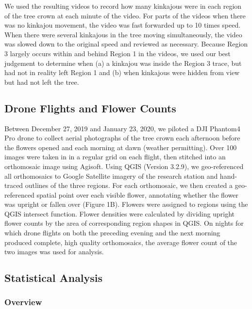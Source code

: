 \documentclass[twoside,12pt,final]{ucthesis-CA2012}
\begin{document}
\begin{ucmainmatter}
\begin{figure}[htbp]
{\label{fig1}}
\end{figure}
We used the resulting videos to record how many kinkajous were in each region of the tree crown at each minute of the video. For parts of the videos when there was no kinkajou movement, the video was fast forwarded up to 10 times speed. When there were several kinkajous in the tree moving simultaneously, the video was slowed down to the original speed and reviewed as necessary. Because Region 3 largely occurs within and behind Region 1 in the videos, we used our best judgement to determine when (a) a kinkajou was inside the Region 3 trace, but had not in reality left Region 1 and (b) when kinkajous were hidden from view but had not left the tree.

\hypertarget{drone-flights-and-flower-counts}{%
\subsection{Drone Flights and Flower Counts}\label{drone-flights-and-flower-counts}}

Between December 27, 2019 and January 23, 2020, we piloted a DJI Phantom4 Pro drone to collect aerial photographs of the tree crown each afternoon before the flowers opened and each morning at dawn (weather permitting). Over 100 images were taken in in a regular grid on each flight, then stitched into an orthomosaic image using Agisoft. Using QGIS (Version 3.2.9), we geo-referenced all orthomosaics to Google Satellite imagery of the research station and hand-traced outlines of the three regions. For each orthomosaic, we then created a geo-referenced spatial point over each visible flower, annotating whether the flower was upright or fallen over (Figure 1B). Flowers were assigned to regions using the QGIS intersect function. Flower densities were calculated by dividing upright flower counts by the area of corresponding region shapes in QGIS. On nights for which drone flights on both the preceding evening and the next morning produced complete, high quality orthomosaics, the average flower count of the two images was used for analysis.

\hypertarget{statistical-analysis}{%
\subsection{Statistical Analysis}\label{statistical-analysis}}

\hypertarget{overview}{%
\subsubsection{Overview}\label{overview}}


\end{ucmainmatter}
\end{document}
